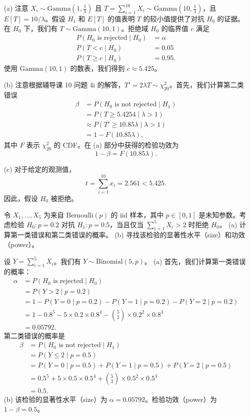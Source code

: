 \begin{questions}
\begin{solution}
(a) 注意 $X_i \sim \text{Gamma}(1, \frac{1}{\lambda})$ 且 $T = \sum_{i=1}^{10} X_i \sim \text{Gamma}(10, \frac{1}{\lambda})$，且 $E[T] = 10/\lambda$。假设 $H_1$ 和 $E[T]$ 的值表明 $T$ 的较小值提供了对抗 $H_0$ 的证据。在 $H_0$ 下，我们有 $T \sim \text{Gamma}(10, 1)$。拒绝域 $H_0$ 的临界值 $c$ 满足
\begin{align*}
P(H_0 \text{ is rejected} \mid H_0) &= \alpha \\
P(T < c \mid H_0) &= 0.05 \\
P(T \ge c \mid H_0) &= 0.95.
\end{align*}
使用 $\text{Gamma}(10, 1)$ 的数表，我们得到 $c \approx 5.425$。

(b) 注意根据辅导课 10 问题 4i 的解答，$T' = 2\lambda T \sim \chi_{20}^2$。首先，我们计算第二类错误
\begin{align*}
\beta &= P(H_0 \text{ is not rejected} \mid H_1) \\
&= P(T \ge 5.4254 \mid \lambda > 1) \\
&\approx P(T' \ge 10.85\lambda \mid \lambda > 1) \\
&= 1 - F(10.85\lambda),
\end{align*}
其中 $F$ 表示 $\chi_{20}^2$ 的 CDF。在 (a) 部分中获得的检验功效为
\[
1 - \beta = F(10.85\lambda).
\]

(c) 对于给定的观测值，
\[
t = \sum_{i=1}^{10} x_i = 2.561 < 5.425.
\]
因此，假设 $H_0$ 被拒绝。
\end{solution}

\question 令 $X_1, \dots, X_5$ 为来自 $\text{Bernoulli}(p)$ 的 iid 样本，其中 $p \in [0, 1]$ 是未知参数。考虑检验 $H_0 : p = 0.2$ 对抗 $H_1 : p = 0.5$，当且仅当 $\sum_{i=1}^5 X_i > 2$ 时拒绝 $H_0$。
(a) 计算第一类错误和第二类错误的概率。
(b) 寻找该检验的显著性水平（size）和功效（power）。

\begin{solution}
设 $Y = \sum_{i=1}^5 X_i$。我们有 $Y \sim \text{Binomial}(5, p)$。
(a) 首先，我们计算第一类错误的概率：
\begin{align*}
\alpha &= P(H_0 \text{ is rejected} \mid H_0) \\
&= P(Y > 2 \mid p = 0.2) \\
&= 1 - P(Y = 0 \mid p = 0.2) - P(Y = 1 \mid p = 0.2) - P(Y = 2 \mid p = 0.2) \\
&= 1 - 0.8^5 - 5 \times 0.2 \times 0.8^4 - \binom{5}{2} \times 0.2^2 \times 0.8^3 \\
&= 0.05792.
\end{align*}
第二类错误的概率是
\begin{align*}
\beta &= P(H_0 \text{ is not rejected} \mid H_1) \\
&= P(Y \le 2 \mid p = 0.5) \\
&= P(Y = 0 \mid p = 0.5) + P(Y = 1 \mid p = 0.5) + P(Y = 2 \mid p = 0.5) \\
&= 0.5^5 + 5 \times 0.5 \times 0.5^4 + \binom{5}{2} \times 0.5^2 \times 0.5^3 \\
&= 0.5.
\end{align*}
(b) 该检验的显著性水平（size）为 $\alpha = 0.05792$。检验功效（power）为 $1 - \beta = 0.5$。
\end{solution}
\end{questions}
